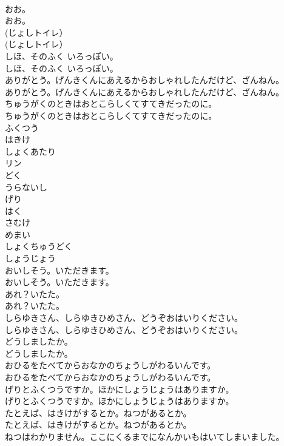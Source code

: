 \documentclass[8pt]{extreport}
\begin{document}
\begin{CJK}{UTF8}{min}
\\	おお。
\\	おお。
\\	(じょしトイレ）
\\	(じょしトイレ）
\\	しほ、そのふく いろっぽい。
\\	しほ、そのふく いろっぽい。
\\	ありがとう。げんきくんにあえるからおしゃれしたんだけど、ざんねん。
\\	ありがとう。げんきくんにあえるからおしゃれしたんだけど、ざんねん。
\\	ちゅうがくのときはおとこらしくてすてきだったのに。
\\	ちゅうがくのときはおとこらしくてすてきだったのに。
\\	ふくつう
\\	はきけ
\\	しょくあたり
\\	リン
\\	どく
\\	うらないし
\\	げり
\\	はく
\\	さむけ
\\	めまい
\\	しょくちゅうどく
\\	しょうじょう
\\	おいしそう。いただきます。
\\	おいしそう。いただきます。
\\	あれ？いたた。
\\	あれ？いたた。
\\	しらゆきさん、しらゆきひめさん、どうぞおはいりください。
\\	しらゆきさん、しらゆきひめさん、どうぞおはいりください。
\\	どうしましたか。
\\	どうしましたか。
\\	おひるをたべてからおなかのちょうしがわるいんです。
\\	おひるをたべてからおなかのちょうしがわるいんです。
\\	げりとふくつうですか。ほかにしょうじょうはありますか。
\\	げりとふくつうですか。ほかにしょうじょうはありますか。
\\	たとえば、はきけがするとか。ねつがあるとか。
\\	たとえば、はきけがするとか。ねつがあるとか。
\\	ねつはわかりません。ここにくるまでになんかいもはいてしまいました。

\end{CJK}
\end{document}

